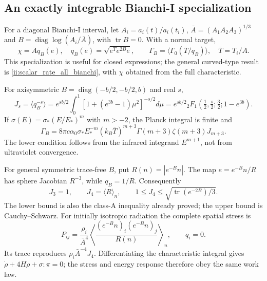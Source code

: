 \subsection{An exactly integrable Bianchi-I specialization}
For a diagonal Bianchi-I interval, let $A_i=a_i(t)/a_i(t_i)$, $\bar A=(A_1A_2A_3)^{1/3}$ and $B=\operatorname{diag}\log(A_i/\bar A)$, with $\operatorname{tr}B=0$. With a normal target,
\begin{equation}
 \chi=\bar A q_B(e),\quad q_B(e)=\sqrt{e^Te^{2B}e},\qquad
 \Gamma_B=\langle\Gamma_0(\bar T/q_B)\rangle,\quad \bar T=T_i/\bar A.
 \label{ii:scalar_rate_BI}
\end{equation}
This specialization is useful for closed expressions; the general curved-type result is \eqref{ii:scalar_rate_all_bianchi}, with $\chi$ obtained from the full characteristic.

For axisymmetric $B=\operatorname{diag}(-b/2,-b/2,b)$ and real $s$,
\begin{equation}
 J_s=\langle q_B^{-s}\rangle
 =e^{sb/2}\int_0^1[1+(e^{3b}-1)\mu^2]^{-s/2}d\mu
 =e^{sb/2}{}_2F_1(\tfrac12,\tfrac s2;\tfrac32;1-e^{3b}).
 \label{ii:axisymmetric_response}
\end{equation}
If $\sigma(E)=\sigma_*(E/E_*)^m$ with $m>-2$, the Planck integral is finite and
\begin{equation}
 \Gamma_B=8\pi c\alpha_0\sigma_*E_*^{-m}(k_B\bar T)^{m+3}
          \Gamma(m+3)\zeta(m+3)J_{m+3}.
 \label{ii:powerlaw_response}
\end{equation}
The lower condition follows from the infrared integrand $E^{m+1}$, not from ultraviolet convergence.

For general symmetric trace-free $B$, put $R(n)=|e^{-B}n|$. The map $e=e^{-B}n/R$ has sphere Jacobian $R^{-3}$, while $q_B=1/R$. Consequently
\begin{equation}
 J_3=1,\qquad J_4=\langle R\rangle_n,\qquad
 1\le J_4\le\sqrt{\operatorname{tr}(e^{-2B})/3}.
 \label{ii:BI_response_bounds}
\end{equation}
The lower bound is also the class-A inequality already proved; the upper bound is Cauchy--Schwarz. For initially isotropic radiation the complete spatial stress is
\begin{equation}
 P_{ij}=\frac{\rho_i}{\bar A^4}
 \left\langle\frac{(e^{-B}n)_i(e^{-B}n)_j}{R(n)}\right\rangle_n,
 \qquad q_i=0.
 \label{ii:BI_exact_stress}
\end{equation}
Its trace reproduces $\rho_i\bar A^{-4}J_4$. Differentiating the characteristic integral gives $\dot\rho+4H\rho+\sigma:\pi=0$; the stress and energy response therefore obey the same work law.

